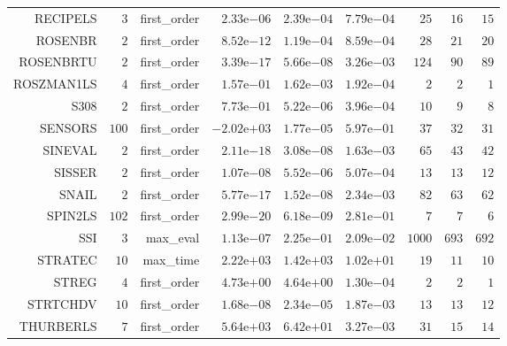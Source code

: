 \begin{longtable}{rrrrrrrrr}
RECIPELS & \(     3\) & first\_order & \( 2.33\)e\(-06\) & \( 2.39\)e\(-04\) & \( 7.79\)e\(-04\) & \(    25\) & \(    16\) & \(    15\) \\
ROSENBR & \(     2\) & first\_order & \( 8.52\)e\(-12\) & \( 1.19\)e\(-04\) & \( 8.59\)e\(-04\) & \(    28\) & \(    21\) & \(    20\) \\
ROSENBRTU & \(     2\) & first\_order & \( 3.39\)e\(-17\) & \( 5.66\)e\(-08\) & \( 3.26\)e\(-03\) & \(   124\) & \(    90\) & \(    89\) \\
ROSZMAN1LS & \(     4\) & first\_order & \( 1.57\)e\(-01\) & \( 1.62\)e\(-03\) & \( 1.92\)e\(-04\) & \(     2\) & \(     2\) & \(     1\) \\
S308 & \(     2\) & first\_order & \( 7.73\)e\(-01\) & \( 5.22\)e\(-06\) & \( 3.96\)e\(-04\) & \(    10\) & \(     9\) & \(     8\) \\
SENSORS & \(   100\) & first\_order & \(-2.02\)e\(+03\) & \( 1.77\)e\(-05\) & \( 5.97\)e\(-01\) & \(    37\) & \(    32\) & \(    31\) \\
SINEVAL & \(     2\) & first\_order & \( 2.11\)e\(-18\) & \( 3.08\)e\(-08\) & \( 1.63\)e\(-03\) & \(    65\) & \(    43\) & \(    42\) \\
SISSER & \(     2\) & first\_order & \( 1.07\)e\(-08\) & \( 5.52\)e\(-06\) & \( 5.07\)e\(-04\) & \(    13\) & \(    13\) & \(    12\) \\
SNAIL & \(     2\) & first\_order & \( 5.77\)e\(-17\) & \( 1.52\)e\(-08\) & \( 2.34\)e\(-03\) & \(    82\) & \(    63\) & \(    62\) \\
SPIN2LS & \(   102\) & first\_order & \( 2.99\)e\(-20\) & \( 6.18\)e\(-09\) & \( 2.81\)e\(-01\) & \(     7\) & \(     7\) & \(     6\) \\
SSI & \(     3\) & max\_eval & \( 1.13\)e\(-07\) & \( 2.25\)e\(-01\) & \( 2.09\)e\(-02\) & \(  1000\) & \(   693\) & \(   692\) \\
STRATEC & \(    10\) & max\_time & \( 2.22\)e\(+03\) & \( 1.42\)e\(+03\) & \( 1.02\)e\(+01\) & \(    19\) & \(    11\) & \(    10\) \\
STREG & \(     4\) & first\_order & \( 4.73\)e\(+00\) & \( 4.64\)e\(+00\) & \( 1.30\)e\(-04\) & \(     2\) & \(     2\) & \(     1\) \\
STRTCHDV & \(    10\) & first\_order & \( 1.68\)e\(-08\) & \( 2.34\)e\(-05\) & \( 1.87\)e\(-03\) & \(    13\) & \(    13\) & \(    12\) \\
THURBERLS & \(     7\) & first\_order & \( 5.64\)e\(+03\) & \( 6.42\)e\(+01\) & \( 3.27\)e\(-03\) & \(    31\) & \(    15\) & \(    14\) \\

\end{longtable}
